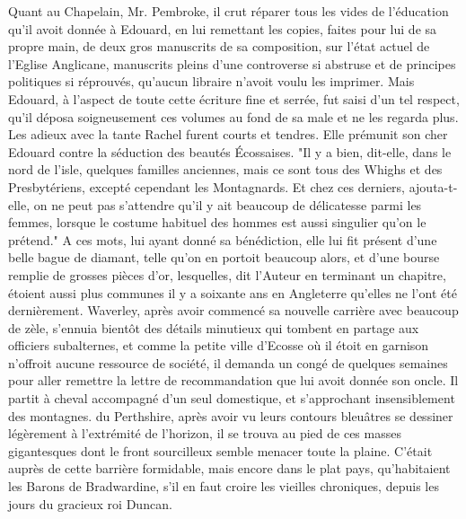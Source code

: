 Quant au Chapelain, Mr. Pembroke, il crut réparer tous les vides de l'éducation qu'il avoit donnée à Edouard, en lui remettant les copies, faites pour lui de sa propre main, de deux gros manuscrits de sa composition, sur l'état actuel de l'Eglise Anglicane, manuscrits pleins d'une controverse si abstruse et de principes politiques si réprouvés, qu'aucun libraire n'avoit voulu les imprimer. Mais Edouard, à l'aspect de toute cette écriture fine et serrée, fut saisi d'un tel respect, qu'il déposa soigneusement ces volumes au fond de sa male et ne les regarda plus.
Les adieux avec la tante Rachel furent courts et tendres. Elle prémunit son cher\setcounter{page}{542} Edouard contre la séduction des beautés Écossaises. "Il y a bien, dit-elle, dans le nord de l'isle, quelques familles anciennes, mais ce sont tous des Whighs et des Presbytériens, excepté cependant les Montagnards. Et chez ces derniers, ajouta-t-elle, on ne peut pas s'attendre qu'il y ait beaucoup de délicatesse parmi les femmes, lorsque le costume habituel des hommes est aussi singulier qu'on le prétend." A ces mots, lui ayant donné sa bénédiction, elle lui fit présent d'une belle bague de diamant, telle qu'on en portoit beaucoup alors, et d'une bourse remplie de grosses pièces d'or, lesquelles, dit l'Auteur en terminant un chapitre, étoient aussi plus communes il y a soixante ans en Angleterre qu'elles ne l'ont été dernièrement.
Waverley, après avoir commencé sa nouvelle carrière avec beaucoup de zèle, s'ennuia bientôt des détails minutieux qui tombent en partage aux officiers subalternes, et comme la petite ville d'Ecosse où il étoit en garnison n'offroit aucune ressource de société, il demanda un congé de quelques semaines pour aller remettre la lettre de recommandation que lui avoit donnée son oncle. Il partit à cheval accompagné d'un seul domestique, et s'approchant insensiblement des montagnes.\setcounter{page}{543} du Perthshire, après avoir vu leurs contours bleuâtres se dessiner légèrement à l'extrémité de l'horizon, il se trouva au pied de ces masses gigantesques dont le front sourcilleux semble menacer toute la plaine. C'était auprès de cette barrière formidable, mais encore dans le plat pays, qu'habitaient les Barons de Bradwardine, s'il en faut croire les vieilles chroniques, depuis les jours du gracieux roi Duncan.
